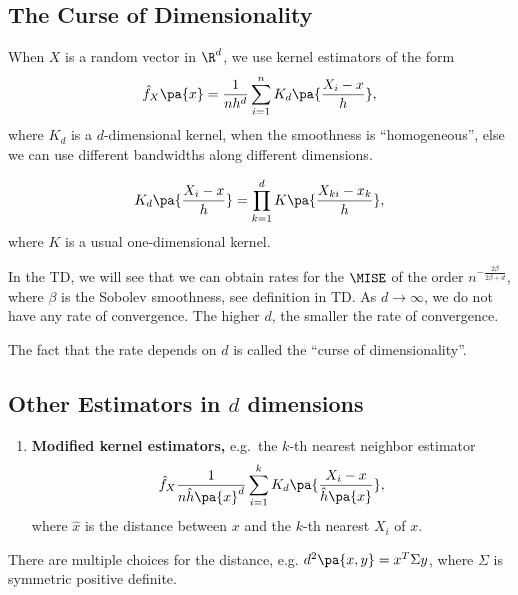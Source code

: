 \newpage
{}
\subsection{The Curse of Dimensionality}

When $X$ is a random vector in $\R^d$, we use kernel estimators of the form
\begin{equation}
  \hat{f}_X\pa{x} = \frac{1}{nh^d} \sum_{i=1}^n K_d\pa{\frac{X_i-x}{h}},
\end{equation}
where $K_d$ is a $d$-dimensional kernel, when the smoothness is ``homogeneous'', else we can use different bandwidths along different dimensions.

\begin{example}
  \begin{equation}
    K_d\pa{\frac{X_i -x}{h}} = \prod_{k=1}^d K\pa{\frac{X_{ki} - x_k}{h} },
  \end{equation}
  where $K$ is a usual one-dimensional kernel.
\end{example}

In the TD, we will see that we can obtain rates for the $\MISE$ of the order $n^{-\frac{2\beta}{2\beta +d}}$, where $\beta$ is the Sobolev smoothness, see definition in TD. As $d\rightarrow \infty$, we do not have any rate of convergence. The higher $d$, the smaller the rate of convergence.

The fact that the rate depends on $d$ is called the ``curse of dimensionality''.

\subsection{Other Estimators in \texorpdfstring{$d$}{d} dimensions}
\begin{enumerate}
  \item \textbf{Modified kernel estimators,} e.g.~the $k$-th nearest neighbor estimator
  \begin{equation}
    \hat{f}_X \frac{1}{n\hat{h}\pa{x}^d} \sum_{i=1}^k K_d \pa{\frac{X_i-x}{\hat{h}\pa{x}}},
  \end{equation}
  where $\hat{x}$ is the distance between $x$ and the $k$-th nearest $X_i$ of $x$.
\end{enumerate}

\begin{remark}
  There are multiple choices for the distance, e.g. $d^2\pa{x,y}= x^T \Sigma y$, where $\Sigma$ is symmetric positive definite.
\end{remark}

